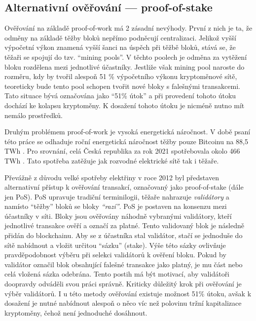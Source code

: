 \subsection{Alternativní ověřování --- proof-of-stake}
\label{proof-of-stake-subsection}
Ověřování na základě proof-of-work má 2 zásadní nevýhody. První z nich je ta, že odměny na základě těžby bloků nepřímo podněcují centralizaci.
Jelikož vyšší výpočetní výkon znamená vyšší šanci na úspěch při těžbě bloků, stává se, že těžaři se spojují do tzv. \enquote{mining pools}.
V těchto poolech je odměna za vytěžení bloku rozdělena mezi jednotlivé účastníky. Jestliže však mining pool naroste do rozměru, kdy by tvořil
alespoň 51 \% výpočetního výkonu kryptoměnové sítě, teoreticky bude tento pool schopen tvořit nové bloky s falešnými transakcemi. Tato situace
bývá označována jako \enquote{51\% útok} a při provedení tohoto útoku dochází ke kolapsu kryptoměny. K dosažení tohoto útoku je nicméně
nutno mít nemálo prostředků.

Druhým problémem proof-of-work je vysoká energetická náročnost. V době psaní této práce se odhaduje roční energetická náročnost těžby pouze Bitcoinu
na 88,5 TWh \cite{crypto:energy-consumption-bitcon}. Pro srovnání, celá Česká republika za rok 2021 spotřebovala okolo 466 TWh \cite{crypto:energy-consumption-czechia}.
Tato spotřeba zatěžuje jak rozvodné elektrické sítě tak i těžaře.

Převážně z důvodu velké spotřeby elektřiny v roce 2012 byl představen alternativní přístup k ověřování transakcí, označovaný jako proof-of-stake (dále jen PoS).
PoS upravuje tradiční terminilogii, těžaře nahrazuje \emph{validátory} a namísto \enquote{těžby} bloků se bloky \emph{\enquote{razí}}. PoS je
postaven na konsenzu mezi účastníky v síti. Bloky jsou ověřovány náhodně vybranými validátory, kteří jednotlivé transakce ověří a označí za platné.
Tento validovaný blok je následně přidán do blockchainu. Aby se z účastníka stal validátor, stačí se jednoduše do sítě nabídnout a vložit určitou
\enquote{sázku} (stake). Výše této sázky ovlivňuje pravděpodobnost výběru při selekci validátorů k ověření bloku. Pokud by validátor označil
blok obsahující falešné transakce jako platný, je mu část nebo celá vložená sázka odebrána. Tento postih má být motivací, aby validátoři doopravdy
odváděli svou práci správně. Kriticky důležitý krok při ověřování je výběr validátorů. I u této metody ověřování existuje možnost 51\% útoku,
avšak k dosažení je nutné nabídnout alespoň o něco víc než polovinu tržní kapitalizace kryptoměny, čehož není jednoduché dosáhnout.

